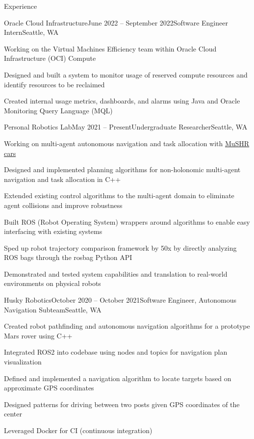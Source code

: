 \documentclass{resume} %
\begin{document}
\begin{rSection}{Experience}

\begin{rSubsection}{Oracle Cloud Infrastructure}{June 2022 – September 2022}{Software Engineer Intern}{Seattle, WA}
\item Working on the Virtual Machines Efficiency team within Oracle Cloud Infrastructure (OCI) Compute
\item Designed and built a system to monitor usage of reserved compute resources and identify resources to be reclaimed
\item Created internal usage metrics, dashboards, and alarms using Java and Oracle Monitoring Query Language (MQL)
\end{rSubsection}

\begin{rSubsection}{Personal Robotics Lab}{May 2021 – Present}{Undergraduate Researcher}{Seattle, WA}
\item Working on multi-agent autonomous navigation and task allocation with \href{https://mushr.io}{MuSHR cars}
\item Designed and implemented planning algorithms for non-holonomic multi-agent navigation and task allocation in C++
\item Extended existing control algorithms to the multi-agent domain to eliminate agent collisions and improve robustness
\item Built ROS (Robot Operating System) wrappers around algorithms to enable easy interfacing with existing systems
\item Sped up robot trajectory comparison framework by 50x by directly analyzing ROS bags through the rosbag Python API
\item Demonstrated and tested system capabilities and translation to real-world environments on physical robots
\end{rSubsection}

\begin{rSubsection}{Husky Robotics}{October 2020 – October 2021}{Software Engineer, Autonomous Navigation Subteam}{Seattle, WA}
\item Created robot pathfinding and autonomous navigation algorithms for a prototype Mars rover using C++
\item Integrated ROS2 into codebase using nodes and topics for navigation plan visualization
\item Defined and implemented a navigation algorithm to locate targets based on approximate GPS coordinates
\item Designed patterns for driving between two posts given GPS coordinates of the center
\item Leveraged Docker for CI (continuous integration)
\end{rSubsection}

\end{rSection}
\end{document}

